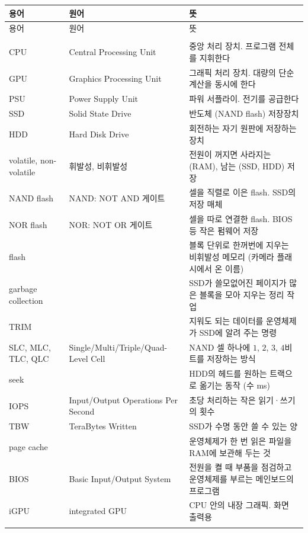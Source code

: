\documentclass[11pt,a4paper]{article}
\begin{document}
{\small
\begin{longtable}{@{}>{\raggedright\arraybackslash}p{24mm}>{\raggedright\arraybackslash}p{50mm}>{\raggedright\arraybackslash}p{76mm}@{}}
\toprule
용어 & 원어 & 뜻 \\
\midrule
\endfirsthead
\toprule
용어 & 원어 & 뜻 \\
\midrule
\endhead
\bottomrule
\endfoot
\multicolumn{3}{@{}l}{\textbf{부품}} \\
CPU & Central Processing Unit & 중앙 처리 장치. 프로그램 전체를 지휘한다 \\
GPU & Graphics Processing Unit & 그래픽 처리 장치. 대량의 단순 계산을 동시에 한다 \\
PSU & Power Supply Unit & 파워 서플라이. 전기를 공급한다 \\
SSD & Solid State Drive & 반도체 (NAND flash) 저장장치 \\
HDD & Hard Disk Drive & 회전하는 자기 원판에 저장하는 장치 \\
volatile, non-volatile & 휘발성, 비휘발성 & 전원이 꺼지면 사라지는 (RAM), 남는 (SSD, HDD) 저장 \\
NAND flash & NAND: NOT AND 게이트 & 셀을 직렬로 이은 flash. SSD의 저장 매체 \\
NOR flash & NOR: NOT OR 게이트 & 셀을 따로 연결한 flash. BIOS 등 작은 펌웨어 저장 \\
flash & & 블록 단위로 한꺼번에 지우는 비휘발성 메모리 (카메라 플래시에서 온 이름) \\
garbage collection & & SSD가 쓸모없어진 페이지가 많은 블록을 모아 지우는 정리 작업 \\
TRIM & & 지워도 되는 데이터를 운영체제가 SSD에 알려 주는 명령 \\
SLC, MLC, TLC, QLC & Single/Multi/Triple/Quad-Level Cell & NAND 셀 하나에 $1$, $2$, $3$, $4$비트를 저장하는 방식 \\
seek & & HDD의 헤드를 원하는 트랙으로 옮기는 동작 (수 ms) \\
IOPS & Input/Output Operations Per Second & 초당 처리하는 작은 읽기·쓰기의 횟수 \\
TBW & TeraBytes Written & SSD가 수명 동안 쓸 수 있는 양 \\
page cache & & 운영체제가 한 번 읽은 파일을 RAM에 보관해 두는 것 \\
BIOS & Basic Input/Output System & 전원을 켤 때 부품을 점검하고 운영체제를 부르는 메인보드의 프로그램 \\
iGPU & integrated GPU & CPU 안의 내장 그래픽. 화면 출력용 \\
\multicolumn{3}{@{}l}{\textbf{연결}} \\

\end{longtable}}
\end{document}

